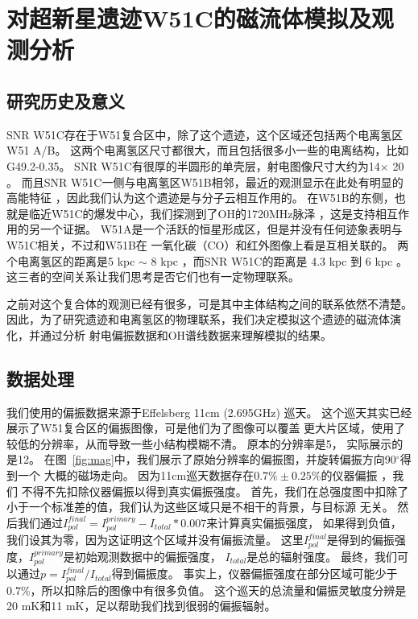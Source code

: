 \chapter{对超新星遗迹W51C的磁流体模拟及观测分析}
\label{W51C}



\section{研究历史及意义}
\label{W51Cintro}
SNR W51C存在于W51复合区中，除了这个遗迹，这个区域还包括两个电离氢区W51 A/B。
这两个电离氢区尺寸都很大，而且包括很多小一些的电离结构，比如G49.2-0.35。
SNR W51C有很厚的半圆形的单壳层，射电图像尺寸大约为14\am $\times$ 20\am
\citep{Copetti1991,Subrahmanyan1995}。
而且SNR W51C一侧与电离氢区W51B相邻，最近的观测显示在此处有明显的高能特征
\citep{Abdo2009,Aleksic2012}，因此我们认为这个遗迹是与分子云相互作用的。
在W51B的东侧，也就是临近W51C的爆发中心，我们探测到了OH的1720MHz脉泽
\citep{Hewitt2008,Brogan2013}，这是支持相互作用的另一个证据。
W51A是一个活跃的恒星形成区，但是并没有任何迹象表明与W51C相关，不过和W51B在
一氧化碳（CO）和红外图像上看是互相关联的\citep{Kang2010,Parsons2012,Ginsburg2015}。
两个电离氢区的距离是5 kpc $\sim$ 8 kpc
\citep{Genzel1981,Schneps1981,Xu2009,Sato2010,Tian2013}，而SNR W51C的距离是
4.3 kpc \citep{Tian2013} 到 6 kpc \citep{Koo1995}。
这三者的空间关系让我们思考是否它们也有一定物理联系。

之前对这个复合体的观测已经有很多，可是其中主体结构之间的联系依然不清楚。
因此，为了研究遗迹和电离氢区的物理联系，我们决定模拟这个遗迹的磁流体演化，并通过分析
射电偏振数据和OH谱线数据来理解模拟的结果。

\section{数据处理}
\label{W51Cdata}

我们使用的偏振数据来源于Effelsberg 11cm (2.695GHz) 巡天\citep{1999A&A...350..447D}。
这个巡天其实已经展示了W51复合区的偏振图像，可是他们为了图像可以覆盖
更大片区域，使用了较低的分辨率，从而导致一些小结构模糊不清。
原本的分辨率是5\am， 实际展示的是12\am。
在图~\ref{fig:mag}中，我们展示了原始分辨率的偏振图，并旋转偏振方向90$^{\circ}$得到一个
大概的磁场走向。
因为11cm巡天数据存在$0.7\% \pm 0.25\%$的仪器偏振 \citep{1987A&AS...69..451J}，我们
不得不先扣除仪器偏振以得到真实偏振强度。
首先，我们在总强度图中扣除了小于一个标准差的值，我们认为这些区域只是不相干的背景，与目标源
无关。
然后我们通过$I^{final}_{pol}=I^{primary}_{pol}-I_{total}*0.007$来计算真实偏振强度，
如果得到负值，我们设其为零，因为这证明这个区域并没有偏振流量。
这里$I^{final}_{pol}$是得到的偏振强度，$I^{primary}_{pol}$是初始观测数据中的偏振强度，
$I_{total}$是总的辐射强度。
最终，我们可以通过$p=I^{final}_{pol}/I_{total}$得到偏振度。
事实上，仪器偏振强度在部分区域可能少于$0.7\%$，所以扣除后的图像中有很多负值。
这个巡天的总流量和偏振灵敏度分辨是20 mK和11 mK，足以帮助我们找到很弱的偏振辐射。

